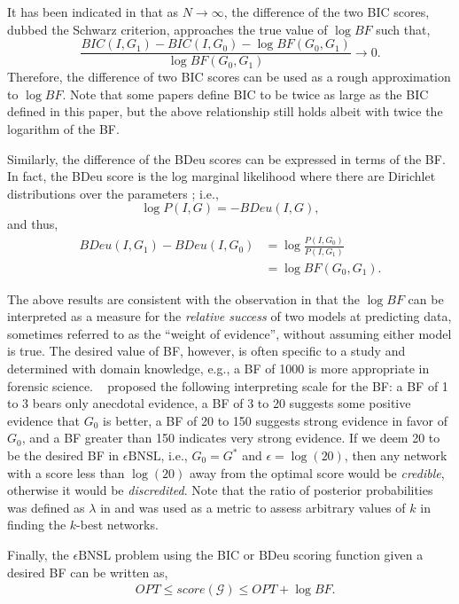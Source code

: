 \documentclass[letterpaper]{article}
\newcommand{\opt}{\mathit{OPT}}
\newcommand{\graph}{\mathit{G}}
\newcommand{\graphset}{\mathcal{G}}
\newcommand{\cost}{\mathit{score}}
\newcommand{\problem}{\mathit{\epsilon}\text{BNSL}}
\newcommand{\varI}{I}
\begin{document}
It has been indicated in \cite{kass1995bayes} that as $N\rightarrow\infty$, the difference of the two BIC scores, 
dubbed the Schwarz criterion,  approaches the true value of $\log{BF}$ such that,
$$
\frac{BIC(\varI,\graph_1)-BIC(\varI,\graph_0)-\log{BF(\graph_0,\graph_1)}}{\log{BF(\graph_0,\graph_1)}}\rightarrow 0.
$$
Therefore, the difference of two BIC scores can be used as a rough approximation to $\log{BF}$. Note that some papers define BIC to be twice as large as the BIC defined in this paper, but the above relationship still holds albeit with twice the logarithm of the BF.

Similarly, the difference of the BDeu scores can be expressed in terms of the BF. In fact, the BDeu score is the log marginal likelihood where there are Dirichlet distributions over the parameters \cite{Buntine91,HeckermanGC95}; i.e.,
$$
\log{P(\varI,\graph)}=-BDeu(\varI,\graph),
$$
and thus,
\begin{align*}
    BDeu(\varI,\graph_1)-BDeu(\varI,\graph_0)&=\log{\frac{P(\varI,\graph_0)}{P(\varI,\graph_1)}}\\
    &=\log{BF(\graph_0,\graph_1)}.
\end{align*}

The above results are consistent with the observation in \cite{kass1995bayes} that the $\log{BF}$ can be interpreted as a measure for the \emph{relative success} of two models at predicting data, sometimes referred to as the ``weight of evidence'', without assuming either model is true. The desired value of BF, however, is often specific to a study and determined with domain knowledge, e.g., a BF of 1000 is more appropriate in forensic science. \citeauthor{HeckermanGC95}~ proposed the following interpreting scale for the BF: a BF of 1 to 3 bears only anecdotal evidence, a BF of 3 to 20 suggests some positive evidence that $\graph_0$ is better, a BF of 20 to 150 suggests strong evidence in favor of $\graph_0$, and a BF greater than 150 indicates very strong evidence. If we deem 20 to be the desired BF in $\problem$, i.e., $\graph_0=\graph^*$ and $\epsilon=\log(20)$, then any network with a score less than $\log(20)$ away from the optimal score would be \emph{credible}, otherwise it would be \emph{discredited}. Note that the ratio of posterior probabilities was defined as $\lambda$ in \cite{TianHR10,ChenT2014} and was used as a metric to assess arbitrary values of $k$ in finding the $k$-best networks.

Finally, the $\problem$ problem using the BIC or BDeu scoring function given a desired BF can be written as,
\begin{align}\label{EQUATION:bf}
    &\opt \le \cost(\graphset) \le \opt+\log{BF}.
\end{align}
\end{document}
